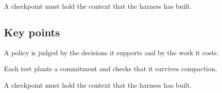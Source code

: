 \begin{takeaway}A checkpoint must hold the context that the harness has built.\end{takeaway}

\subsection*{Key points}
\bi
\item A policy is judged by the decisions it supports and by the work it costs.
\item Each test plants a commitment and checks that it survives compaction.
\item A checkpoint must hold the context that the harness has built.
\ei
